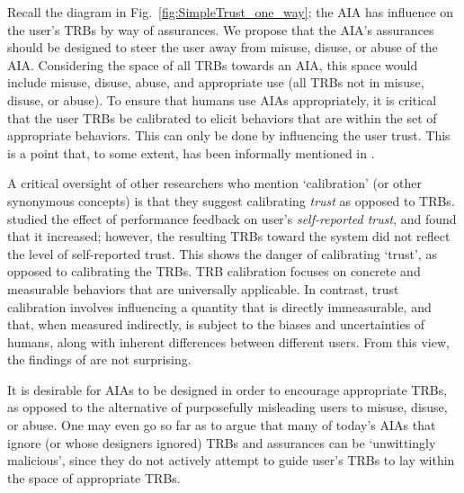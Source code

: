 Recall the diagram in Fig.~\ref{fig:SimpleTrust_one_way}; the AIA has influence on the user's TRBs by way of assurances. We propose that the AIA's assurances should be designed to steer the user away from misuse, disuse, or abuse of the AIA. Considering the space of all TRBs towards an AIA, this space would include misuse, disuse, abuse, and appropriate use (all TRBs not in misuse, disuse, or abuse). To ensure that humans use AIAs appropriately, it is critical that the user TRBs be calibrated to elicit behaviors that are within the set of appropriate behaviors. This can only be done by influencing the user trust. This is a point that, to some extent, has been informally mentioned in \cite{Muir1994-ow,Muir1987-mk,Lillard2016-yg,Lee2004-pv,Hutchins2015-if}.

    A critical oversight of other researchers who mention `calibration' (or other synonymous concepts) is that they suggest calibrating \emph{trust} as opposed to TRBs. \citet{Dzindolet2003-ts} studied the effect of performance feedback on user's \textit{self-reported trust}, and found that it increased; however, the resulting TRBs toward the system did not reflect the level of self-reported trust. This shows the danger of calibrating `trust', as opposed to calibrating the TRBs. TRB calibration focuses on concrete and measurable behaviors that are universally applicable. In contrast, trust calibration involves influencing a quantity that is directly immeasurable, and that, when measured indirectly, is subject to the biases and uncertainties of humans, along with inherent differences between different users. From this view, the findings of \citeauthor{Dzindolet2003-ts} are not surprising.

It is desirable for AIAs to be designed in order to encourage appropriate TRBs, as opposed to the alternative of purposefully misleading users to misuse, disuse, or abuse. One may even go so far as to argue that many of today's AIAs that ignore (or whose designers ignored) TRBs and assurances can be `unwittingly malicious', since they do not actively attempt to guide user's TRBs to lay within the space of appropriate TRBs.
